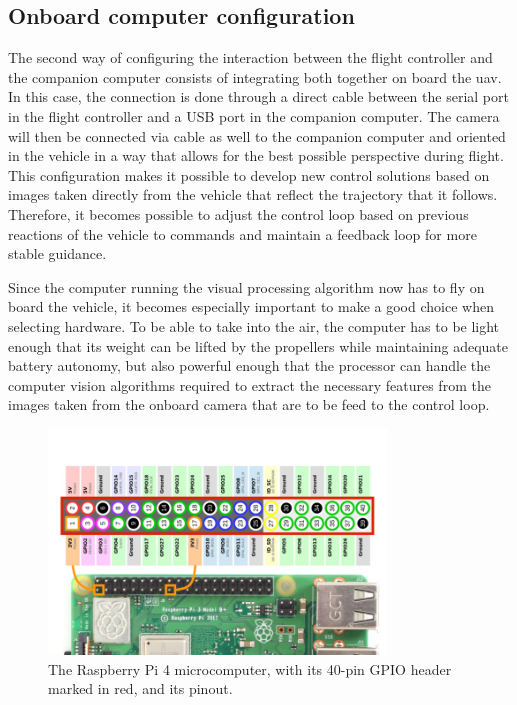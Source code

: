 
\subsection{Onboard computer configuration}
\label{subsec:onboard}

The second way of configuring the interaction between the flight controller and the companion computer consists of integrating both together on board the \gls{uav}.
In this case, the connection is done through a direct cable between the serial port in the flight controller and a USB port in the companion computer.
The camera will then be connected via cable as well to the companion computer and oriented in the vehicle in a way that allows for the best possible perspective during flight.
This configuration makes it possible to develop new control solutions based on images taken directly from the vehicle that reflect the trajectory that it follows.
Therefore, it becomes possible to adjust the control loop based on previous reactions of the vehicle to commands and maintain a feedback loop for more stable guidance.

Since the computer running the visual processing algorithm now has to fly on board the vehicle, it becomes especially important to make a good choice when selecting hardware.
To be able to take into the air, the computer has to be light enough that its weight can be lifted by the propellers while maintaining adequate battery autonomy, but also powerful enough that the processor can handle the computer vision algorithms required to extract the necessary features from the images taken from the onboard camera that are to be feed to the control loop.

\begin{figure}
  \centering
  \includegraphics[width=0.8\textwidth,keepaspectratio]{img/rpi4-pinout.png}
  \caption{The Raspberry Pi 4 microcomputer, with its 40-pin GPIO header marked in red, and its pinout.}
  \label{fig:rpi4-pinout}
\end{figure}

